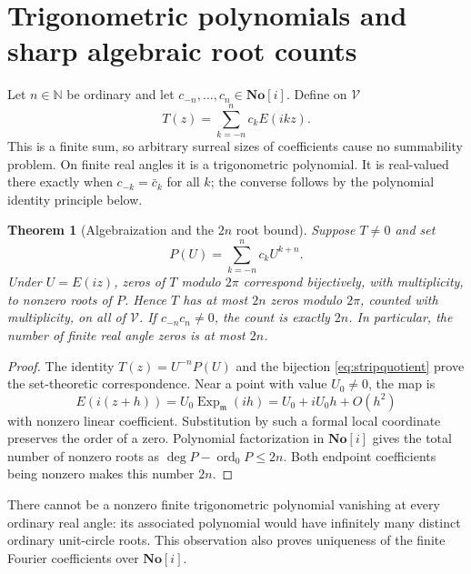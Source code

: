 \documentclass[11pt]{article}
\numberwithin{equation}{section}
\newtheorem{theorem}{Theorem}[section]
\theoremstyle{definition}
\newcommand{\SC}{\mathbf{No}[i]}
\newcommand{\N}{\mathbb N}
\newcommand{\mm}{\mathfrak m}
\newcommand{\Ex}{\operatorname{Exp}_{\mm}}
\begin{document}
\section{Trigonometric polynomials and sharp algebraic root counts}\label{sec:trigpoly}
Let $n\in\N$ be ordinary and let $c_{-n},\ldots,c_n\in\SC$. Define on $\mathscr V$
\begin{equation}\label{eq:trigpoly}
 T(z)=\sum_{k=-n}^{n}c_kE(ikz).
\end{equation}
This is a finite sum, so arbitrary surreal sizes of coefficients cause no summability problem. On finite real angles it is a trigonometric polynomial. It is real-valued there exactly when $c_{-k}=\bar c_k$ for all $k$; the converse follows by the polynomial identity principle below.

\begin{theorem}[Algebraization and the $2n$ root bound]\label{thm:polyroots}
Suppose $T\ne0$ and set
\begin{equation}\label{eq:algebraization}
 P(U)=\sum_{k=-n}^{n}c_kU^{k+n}.
\end{equation}
Under $U=E(iz)$, zeros of $T$ modulo $2\pi$ correspond bijectively, with multiplicity, to nonzero roots of $P$. Hence $T$ has at most $2n$ zeros modulo $2\pi$, counted with multiplicity, on all of $\mathscr V$. If $c_{-n}c_n\ne0$, the count is exactly $2n$. In particular, the number of finite real angle zeros is at most $2n$.
\end{theorem}
\begin{proof}
The identity $T(z)=U^{-n}P(U)$ and the bijection \eqref{eq:stripquotient} prove the set-theoretic correspondence. Near a point with value $U_0\ne0$, the map is
\[
 E(i(z+h))=U_0\Ex(ih)=U_0+iU_0h+O(h^2)
\]
with nonzero linear coefficient. Substitution by such a formal local coordinate preserves the order of a zero. Polynomial factorization in $\SC$ gives the total number of nonzero roots as $\deg P-\operatorname{ord}_0P\le2n$. Both endpoint coefficients being nonzero makes this number $2n$.
\end{proof}
There cannot be a nonzero finite trigonometric polynomial vanishing at every ordinary real angle: its associated polynomial would have infinitely many distinct ordinary unit-circle roots. This observation also proves uniqueness of the finite Fourier coefficients over $\SC$.
\end{document}
